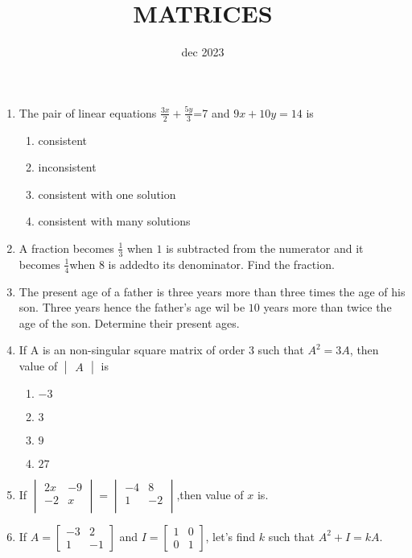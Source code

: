 \documentclass[12pt,-letter paper]{article}
\title{MATRICES}
\author{}
\date{dec 2023}
\providecommand{\mydet}[1]{\ensuremath{\begin{vmatrix}#1\end{vmatrix}}}
\begin{document}
\maketitle

\begin{enumerate}
\item The pair of linear equations
$\frac{3x}{2}+\frac{5y}{3}$=7 and $9x+10y=14$ is\\
\begin{enumerate}[label=(\alph*)]
\item consistent
\item inconsistent
\item consistent with one solution 
\item consistent with many solutions 
\end{enumerate}


\item A fraction becomes $\frac{1}{3}$ when $1$ is subtracted from the numerator and it becomes $\frac{1}{4}$when $8$ is  addedto its denominator. Find the fraction.


\item The present age of a father is three years more than three times the age of his son. Three years hence the father's age wil be $10$ years more than twice the age of the son. Determine their present ages.

\item If A is an non-singular square matrix  of order 3 such that $A^2=3A$, then value of $\mydet{A}$ is\\
\begin{enumerate}[label=(\alph*)]
\item $-3$
\item $3$
\item $9$
\item $27$
\end{enumerate}

\item If $\begin{vmatrix} 2x &-9\\ -2 &x\\ \end{vmatrix}=\begin{vmatrix} -4 &8\\ 1 &-2\\ \end{vmatrix}$,then value of $x$ is. 
		
\item If  \(A = \begin{bmatrix} -3 & 2 \\ 1 & -1 \end{bmatrix}\) and \(I = \begin{bmatrix} 1 & 0 \\ 0 & 1 \end{bmatrix}\), let's find $k$ such that $A^2 + I = kA$.


\end{enumerate}
\end{document}
